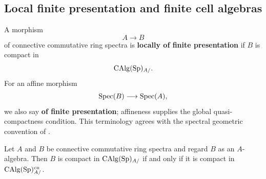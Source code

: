 \subsection{Local finite presentation and finite cell algebras}

\begin{definition}
\label{def:finitely-presented-spectral-algebra}
A morphism
\[
    A\longrightarrow B
\]
of connective commutative ring spectra is \textbf{locally of finite
presentation} if \(B\) is compact in
\[
    \operatorname{CAlg}(\operatorname{Sp})_{A/}.
\]
For an affine morphism
\[
    \operatorname{Spec}(B)\longrightarrow\operatorname{Spec}(A),
\]
we also say \textbf{of finite presentation}; affineness supplies the global
quasi-compactness condition. This terminology agrees with the spectral
geometric convention of \cite{LurieSAG,KhanBraveNewMotivicI}.
\end{definition}

\begin{proposition}
\label{prop:compactness-connective-undercategory}
Let \(A\) and \(B\) be connective commutative ring spectra and regard \(B\)
as an \(A\)-algebra. Then \(B\) is compact in \(\operatorname{CAlg}(\operatorname{Sp})_{A/}\) if and
only if it is compact in \(\operatorname{CAlg}(\operatorname{Sp})^{\mathrm{cn}}_{A/}\).
\end{proposition}


